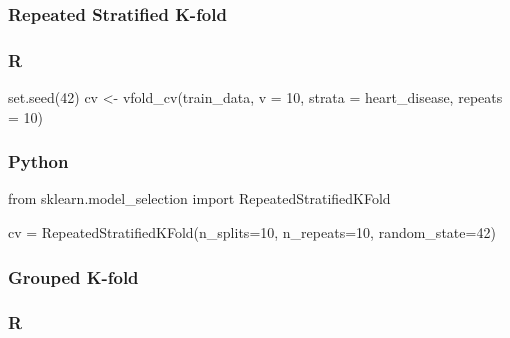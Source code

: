 \documentclass[
  letterpaper,
  DIV=11,
  numbers=noendperiod]{scrreprt}
\newenvironment{Shaded}{\begin{snugshade}}{\end{snugshade}}
\newcommand{\AttributeTok}[1]{\textcolor[rgb]{0.40,0.46,0.14}{#1}}
\newcommand{\DecValTok}[1]{\textcolor[rgb]{0.68,0.00,0.00}{#1}}
\newcommand{\FunctionTok}[1]{\textcolor[rgb]{0.28,0.35,0.67}{#1}}
\newcommand{\ImportTok}[1]{\textcolor[rgb]{0.00,0.46,0.62}{#1}}
\newcommand{\NormalTok}[1]{\textcolor[rgb]{0.00,0.46,0.62}{#1}}
\newcommand{\OperatorTok}[1]{\textcolor[rgb]{0.37,0.37,0.37}{#1}}
\newcommand{\OtherTok}[1]{\textcolor[rgb]{0.00,0.46,0.62}{#1}}
\begin{document}
\hypertarget{repeated-stratified-k-fold}{%
\subsubsection{Repeated Stratified
K-fold}\label{repeated-stratified-k-fold}}

\hypertarget{r-55}{%
\subsubsection{R}\label{r-55}}

\begin{Shaded}
\begin{Highlighting}[]
\FunctionTok{set.seed}\NormalTok{(}\DecValTok{42}\NormalTok{)}
\NormalTok{cv }\OtherTok{\textless{}{-}} \FunctionTok{vfold\_cv}\NormalTok{(train\_data, }\AttributeTok{v =} \DecValTok{10}\NormalTok{, }\AttributeTok{strata =}\NormalTok{ heart\_disease, }\AttributeTok{repeats =} \DecValTok{10}\NormalTok{)}
\end{Highlighting}
\end{Shaded}

\hypertarget{python-55}{%
\subsubsection{Python}\label{python-55}}

\begin{Shaded}
\begin{Highlighting}[]
\ImportTok{from}\NormalTok{ sklearn.model\_selection }\ImportTok{import}\NormalTok{ RepeatedStratifiedKFold}

\NormalTok{cv }\OperatorTok{=}\NormalTok{ RepeatedStratifiedKFold(n\_splits}\OperatorTok{=}\DecValTok{10}\NormalTok{, n\_repeats}\OperatorTok{=}\DecValTok{10}\NormalTok{, random\_state}\OperatorTok{=}\DecValTok{42}\NormalTok{)}
\end{Highlighting}
\end{Shaded}

\hypertarget{grouped-k-fold}{%
\subsubsection{Grouped K-fold}\label{grouped-k-fold}}

\hypertarget{r-56}{%
\subsubsection{R}\label{r-56}}
\end{document}

